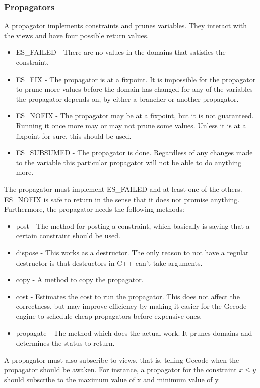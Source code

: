 \documentclass[a4paper,11pt]{article}
\begin{document}
\subsubsection{Propagators}
A propagator implements constraints and prunes variables. They interact with the views and have four possible return values.
\begin{itemize}
\item{ES\_FAILED} - There are no values in the domains that satisfies the constraint. 
\item{ES\_FIX} - The propagator is at a fixpoint. It is impossible for the propagator to prune more values before the domain has changed for any of the variables the propagator depends on, by either a brancher or another propagator.
\item{ES\_NOFIX} - The propagator may be at a fixpoint, but it is not guaranteed. Running it once more may or may not prune some values. Unless it is at a fixpoint for sure, this should be used.
\item{ES\_SUBSUMED} - The propagator is done. Regardless of any changes made to the variable this particular propagator will not be able to do anything more.
\end{itemize}
The propagator must implement ES\_FAILED and at least one of the others. ES\_NOFIX is safe to return in the sense that it does not promise anything. Furthermore, the propagator needs the following methods:
\begin{itemize}
\item{post} - The method for posting a constraint, which basically is saying that a certain constraint should be used.
\item{dispose} - This works as a destructor. The only reason to not have a regular destructor is that destructors in C++ can't take arguments.
\item{copy} - A method to copy the propagator.
\item{cost} - Estimates the cost to run the propagator. This does not affect the correctness, but may improve efficiency by making it easier for the Gecode engine to schedule cheap propagators before expensive ones.
\item{propagate} - The method which does the actual work. It prunes domains and determines the status to return.
\end{itemize}
A propagator must also subscribe to views, that is, telling Gecode when the propagator should be awaken. For instance, a propagator for the constraint $x\le y$ should subscribe to the maximum value of x and minimum value of y.
\end{document}
